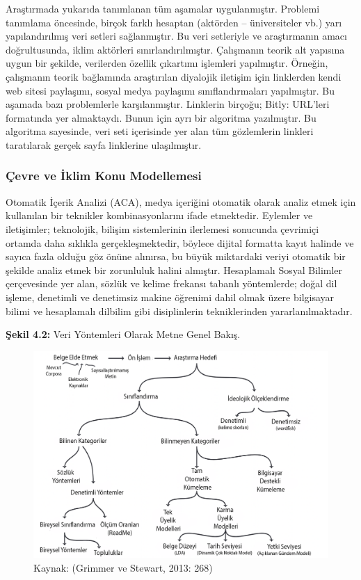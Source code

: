 \documentclass[
]{book}
\begin{document}
Araştırmada yukarıda tanımlanan tüm aşamalar uygulanmıştır. Problemi tanımlama öncesinde, birçok farklı hesaptan (aktörden -- üniversiteler vb.) yarı yapılandırılmış veri setleri sağlanmıştır. Bu veri setleriyle ve araştırmanın amacı doğrultusunda, iklim aktörleri sınırlandırılmıştır. Çalışmanın teorik alt yapısına uygun bir şekilde, verilerden özellik çıkartımı işlemleri yapılmıştır. Örneğin, çalışmanın teorik bağlamında araştırılan diyalojik iletişim için linklerden kendi web sitesi paylaşımı, sosyal medya paylaşımı sınıflandırmaları yapılmıştır. Bu aşamada bazı problemlerle karşılanmıştır. Linklerin birçoğu; Bitly: URL'leri formatında yer almaktaydı. Bunun için ayrı bir algoritma yazılmıştır. Bu algoritma sayesinde, veri seti içerisinde yer alan tüm gözlemlerin linkleri taratılarak gerçek sayfa linklerine ulaşılmıştır.

\hypertarget{uxe7evre-ve-iklim-konu-modellemesi}{%
\subsubsection{Çevre ve İklim Konu Modellemesi}\label{uxe7evre-ve-iklim-konu-modellemesi}}

Otomatik İçerik Analizi (ACA), medya içeriğini otomatik olarak analiz etmek için kullanılan bir teknikler kombinasyonlarını ifade etmektedir. Eylemler ve iletişimler; teknolojik, bilişim sistemlerinin ilerlemesi sonucunda çevrimiçi ortamda daha sıklıkla gerçekleşmektedir, böylece dijital formatta kayıt halinde ve sayıca fazla olduğu göz önüne alınırsa, bu büyük miktardaki veriyi otomatik bir şekilde analiz etmek bir zorunluluk halini almıştır. Hesaplamalı Sosyal Bilimler çerçevesinde yer alan, sözlük ve kelime frekansı tabanlı yöntemlerde; doğal dil işleme, denetimli ve denetimsiz makine öğrenimi dahil olmak üzere bilgisayar bilimi ve hesaplamalı dilbilim gibi disiplinlerin tekniklerinden yararlanılmaktadır. \citep{autocontent}

\textbf{Şekil 4.2:} Veri Yöntemleri Olarak Metne Genel Bakış.

\begin{figure}
\includegraphics[width=0.95\linewidth,height=0.95\textheight]{tablolar-sekiller/sekil-4-2} \caption{Kaynak: (Grimmer ve Stewart, 2013: 268)}\label{fig:unnamed-chunk-2}
\end{figure}
\end{document}
